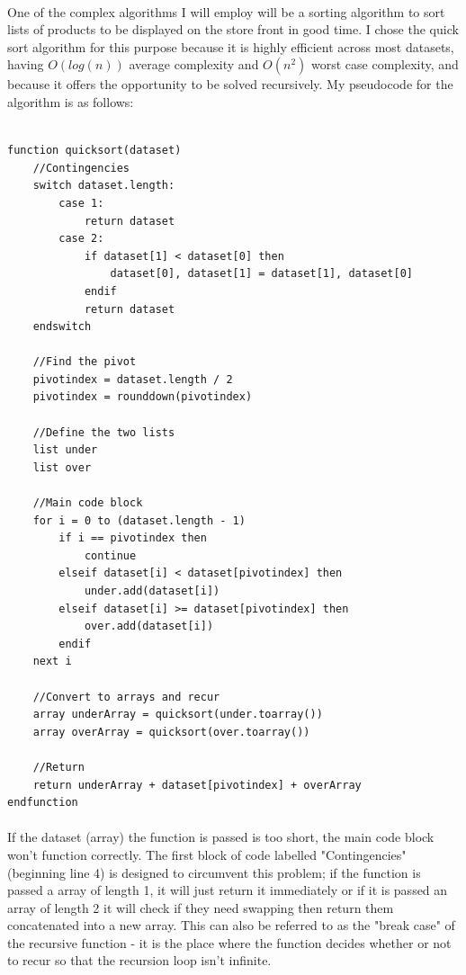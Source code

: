 ﻿\documentclass{article}
\begin{document}
    \paragraph{} One of the complex algorithms I will employ will be a sorting algorithm to sort lists of products to be displayed on the store front in good time.
    I chose the quick sort algorithm for this purpose because it is highly efficient across most datasets, having $O(log(n))$ average complexity and $O(n^2)$ worst case complexity, and because it offers the opportunity to be solved recursively.
    My pseudocode for the algorithm is as follows:
    \begin{lstlisting}[language=psuedocode]

function quicksort(dataset)
    //Contingencies
    switch dataset.length:
        case 1:
            return dataset
        case 2:
            if dataset[1] < dataset[0] then
                dataset[0], dataset[1] = dataset[1], dataset[0]
            endif
            return dataset
    endswitch

    //Find the pivot
    pivotindex = dataset.length / 2
    pivotindex = rounddown(pivotindex)

    //Define the two lists
    list under
    list over

    //Main code block
    for i = 0 to (dataset.length - 1)
        if i == pivotindex then
            continue
        elseif dataset[i] < dataset[pivotindex] then
            under.add(dataset[i])
        elseif dataset[i] >= dataset[pivotindex] then
            over.add(dataset[i])
        endif
    next i

    //Convert to arrays and recur
    array underArray = quicksort(under.toarray())
    array overArray = quicksort(over.toarray())
    
    //Return
    return underArray + dataset[pivotindex] + overArray
endfunction
    \end{lstlisting}
    \paragraph{}
    If the dataset (array) the function is passed is too short, the main code block won't function correctly.
    The first block of code labelled "Contingencies" (beginning line 4) is designed to circumvent this problem; if the function is passed a array of length 1, it will just return it immediately or if it is passed an array of length 2 it will check if they need swapping then return them concatenated into a new array.
    This can also be referred to as the "break case" of the recursive function - it is the place where the function decides whether or not to recur so that the recursion loop isn't infinite.
\end{document}
